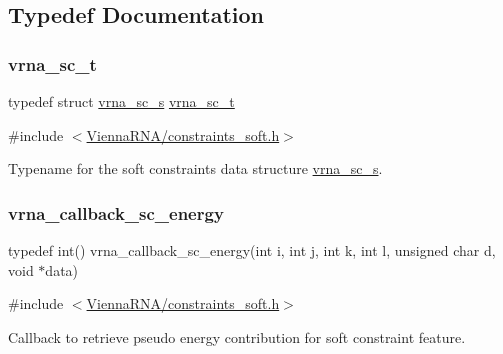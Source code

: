 \subsection{Typedef Documentation}
\mbox{\label{group__soft__constraints_ga75401ce219ef8dbcceb672db82d434c6}} 
\subsubsection{\texorpdfstring{vrna\+\_\+sc\+\_\+t}{vrna\_sc\_t}}
{\footnotesize\ttfamily typedef struct \mbox{\hyperlink{group__soft__constraints_structvrna__sc__s}{vrna\+\_\+sc\+\_\+s}} \mbox{\hyperlink{group__soft__constraints_ga75401ce219ef8dbcceb672db82d434c6}{vrna\+\_\+sc\+\_\+t}}}



{\ttfamily \#include $<$\mbox{\hyperlink{constraints__soft_8h}{Vienna\+R\+N\+A/constraints\+\_\+soft.\+h}}$>$}



Typename for the soft constraints data structure \mbox{\hyperlink{group__soft__constraints_structvrna__sc__s}{vrna\+\_\+sc\+\_\+s}}. 

\mbox{\label{group__soft__constraints_ga88a266695d9e25cc12114dceb7b4565e}} 
\subsubsection{\texorpdfstring{vrna\+\_\+callback\+\_\+sc\+\_\+energy}{vrna\_callback\_sc\_energy}}
{\footnotesize\ttfamily typedef int() vrna\+\_\+callback\+\_\+sc\+\_\+energy(int i, int j, int k, int l, unsigned char d, void $\ast$data)}



{\ttfamily \#include $<$\mbox{\hyperlink{constraints__soft_8h}{Vienna\+R\+N\+A/constraints\+\_\+soft.\+h}}$>$}



Callback to retrieve pseudo energy contribution for soft constraint feature. 

